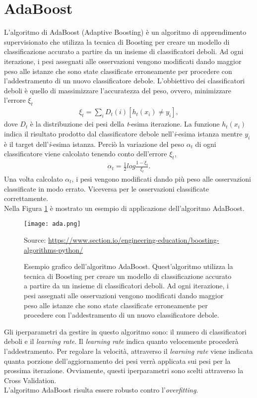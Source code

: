 \section{AdaBoost}
L'algoritmo di AdaBoost (Adaptive Boosting) \autocite{auer1995gambling} è un algoritmo di apprendimento supervisionato che utilizza la tecnica di Boosting per creare un modello di classificazione accurato a partire da un insieme di classificatori deboli. Ad ogni iterazione, i pesi assegnati alle osservazioni vengono modificati dando maggior peso alle istanze che sono state classificate erroneamente per procedere con l'addestramento di un nuovo classificatore debole. L'obbiettivo dei classificatori deboli è quello di massimizzare l'accuratezza del peso, ovvero, minimizzare l'errore $\xi_t$
\begin{align*}
	\xi_t = \sum_{i} D_{t}(i)[h_{t}(x_{i}) \neq y_{i}],
\end{align*} 
dove $D_{t}$ è la distribuzione dei pesi della \emph{t}-esima iterazione. La funzione $h_{t}(x_{i})$ indica il risultato prodotto dal classificatore debole nell'\emph{i}-esima istanza mentre $ y_{i}$ è il target dell'\emph{i}-esima istanza. Perciò la variazione del peso $\alpha_t$ di ogni classificatore viene calcolato tenendo conto dell'errore $\xi_t$,
\begin{align*}
	\alpha_t = \frac{1}{2}log\frac{1-\xi_t}{\xi_t}.
\end{align*} 
Una volta calcolato $\alpha_t$, i pesi vengono modificati dando più peso alle osservazioni classificate in modo errato. Viceversa per le osservazioni classificate correttamente.\\
Nella Figura \ref{fig:ada} è mostrato un esempio di applicazione dell'algoritmo AdaBoost.
\begin{figure}[h]
	\begin{center}
		\texttt{[image: ada.png]}
		\caption{Esempio grafico dell'algoritmo AdaBoost. Quest'algoritmo utilizza la tecnica di Boosting per creare un modello di classificazione accurato a partire da un insieme di classificatori deboli. Ad ogni iterazione, i pesi assegnati alle osservazioni vengono modificati dando maggior peso alle istanze che sono state classificate erroneamente per procedere con l'addestramento di un nuovo classificatore debole.
		} 
		Source: \url{https://www.section.io/engineering-education/boosting-algorithms-python/}\label{fig:ada}
	\end{center}
\end{figure}
Gli iperparametri da gestire in questo algoritmo sono: il numero di classificatori deboli e il \emph{learning rate}. Il \emph{learning rate} indica quanto velocemente procederà l'addestramento. Per regolare la velocità, attraverso il \emph{learning rate} viene indicata quanta porzione dell'aggiornamento dei pesi verrà applicata sui pesi per la prossima iterazione. Ovviamente, questi iperparametri sono scelti attraverso la Cross Validation.\\
L'algoritmo AdaBoost risulta essere robusto contro l'\emph{overfitting}.
	

